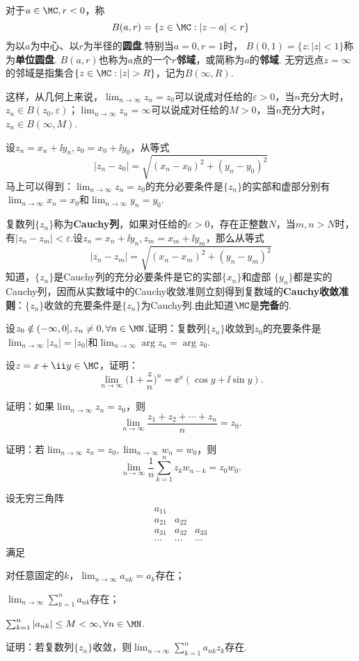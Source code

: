 对于$a\in\MC,r<0$，称
\[B(a,r)=\{z\in\MC:|z-a|<r\}\]
为以$a$为中心、以$r$为半径的\textbf{圆盘}.特别当$a=0,r=1$时， $B(0,1)=\{z:|z|<1\}$称为\textbf{单位圆盘}. $B(a,r)$也称为$a$点的一个\textbf{$r$邻域}，或简称为$a$的\textbf{邻域}. 无穷远点$z=\infty$的邻域是指集合$\{z\in\MC:|z|>R\}$，记为$B(\infty,R)$.

这样，从几何上来说，$\lim_{n\to\infty}z_n=z_0$可以说成对任给的$\varepsilon>0$，当$n$充分大时，$z_n\in B(z_0,\varepsilon)$；$\lim_{n\to\infty}z_n=\infty$可以说成对任给的$M>0$，当$n$充分大时，$z_n\in B(\infty,M)$.

设$z_n=x_n+\ii y_n,z_0=x_0+\ii y_0$，从等式
\[|z_n-z_0|=\sqrt{(x_n-x_0)^2+(y_n-y_0)^2}\]
马上可以得到：$\lim_{n\to\infty}z_n=z_0$的充分必要条件是$\{z_n\}$的实部和虚部分别有$\lim_{n\to\infty}x_n=x_0$和$\lim_{n\to\infty}y_n=y_0$.

复数列$\{z_n\}$称为\textbf{Cauchy列}，如果对任给的$\varepsilon>0$，存在正整数$N$，当$m,n>N$时，有$|z_n-z_m|<\varepsilon$.设$z_n=x_n+\ii y_n,z_m=x_m+\ii y_m$，那么从等式
\[|z_n-z_m|=\sqrt{(x_n-x_m)^2+(y_n-y_m)^2}\]
知道，$\{z_n\}$是Cauchy列的充分必要条件是它的实部$\{x_n\}$和虚部
$\{y_n\}$都是实的Cauchy列，因而从实数域中的Cauchy收敛准则立刻得到复数域的\textbf{Cauchy收敛准则}：$\{z_n\}$收敛的充要条件是$\{z_n\}$为Cauchy列.由此知道$\MC$是\textbf{完备}的.

\begin{xiti}
  \item 设$z_0\notin(-\infty,0],z_n\ne0,\forall n\in\MN$.证明：复数列$\{z_n\}$收敛到$z_0$的充要条件是$\lim_{n\to\infty}|z_n|=|z_0|$和$\lim_{n\to\infty}\arg z_n=\arg z_0$.
  \item 设$z=x+\ii y\in\MC$，证明：
     \[\lim_{n\to\infty}\bigg(1+\frac zn\bigg)^n=\ee^x(\cos y+\ii\sin y).\]
  \item 证明：如果$\lim_{n\to\infty}z_n=z_0$，则
     \[\lim_{n\to\infty}\frac{z_1+z_2+\cdots+z_n}n=z_0.\]
  \item 证明：若$\lim_{n\to\infty}z_n=z_0,\lim_{n\to\infty}w_n=w_0$，则
     \[\lim_{n\to\infty}\frac1n\sum_{k=1}^nz_kw_{n-k}=z_0w_0.\]
  \item 设无穷三角阵
     \[\begin{matrix}
       a_{11}&\\
       a_{21}&a_{22}\\
       a_{31}&a_{32}&a_{33}\\
       \cdots&\cdots&\cdots
     \end{matrix}\]
  满足
  \begin{enuma}
    \item 对任意固定的$k$，$\lim_{n\to\infty}a_{nk}=a_k$存在；
    \item $\lim_{n\to\infty}\sum_{k=1}^na_{nk}$存在；
    \item $\sum_{k=1}^n|a_{nk}|\le M<\infty,\forall n\in \MN$.
  \end{enuma}
  证明：若复数列$\{z_n\}$收敛，则$\lim_{n\to\infty}\sum_{k=1}^na_{nk}z_k$存在.
\end{xiti}

